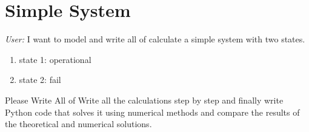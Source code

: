 \documentclass[a4paper,12pt]{article}
\begin{document}
	
	
	\section{Simple System}
	\begin{questionbox}
		\textit{User:} I want to model and write all of calculate a simple system with two states.\\
		\begin{enumerate}
			\item state 1: operational
			\item state 2: fail
		\end{enumerate}
		Please Write All of Write all the calculations step by step and finally write Python code that solves it using numerical methods and compare the results of the theoretical and numerical solutions.
	\end{questionbox}
	
	
	
	
	
\end{document}
